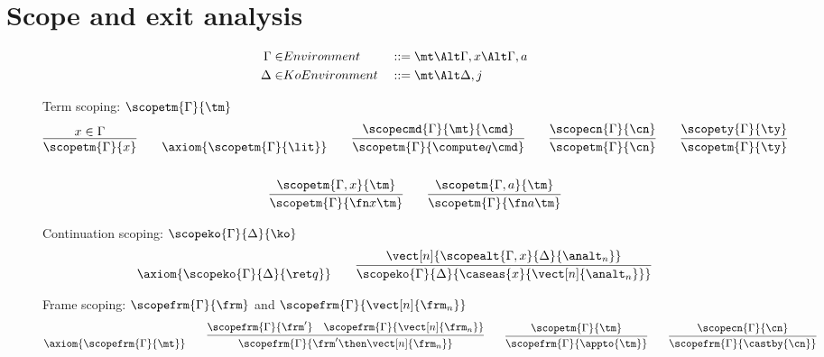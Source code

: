 \documentclass{article}
\begin{document}
\section{Scope and exit analysis}
\label{sec:scope-analysis}

\begin{figure}
\centering
\begin{gather*}
\begin{aligned}
  \Gamma \in& Environment
  &
  &::= \mt
  \Alt \Gamma, x
  \Alt \Gamma, a
  \\
  \Delta \in& KoEnvironment
  &
  &::= \mt
  \Alt \Delta, j
\end{aligned}
\end{gather*}

Term scoping: $\scopetm{\Gamma}{\tm}$
\begin{gather*}
  \infer
  {\scopetm{\Gamma}{x}}
  {x \in \Gamma}
  \qquad
  \axiom{\scopetm{\Gamma}{\lit}}
  \qquad
  \infer
  {\scopetm{\Gamma}{\compute q \cmd}}
  {\scopecmd{\Gamma}{\mt}{\cmd}}
  \qquad
  \infer
  {\scopetm{\Gamma}{\cn}}
  {\scopecn{\Gamma}{\cn}}
  \qquad
  \infer
  {\scopetm{\Gamma}{\ty}}
  {\scopety{\Gamma}{\ty}}
  \\\\
  \infer
  {\scopetm{\Gamma}{\fn x \tm}}
  {\scopetm{\Gamma, x}{\tm}}
  \qquad
  \infer
  {\scopetm{\Gamma}{\fn a \tm}}
  {\scopetm{\Gamma, a}{\tm}}
\end{gather*}

Continuation scoping: $\scopeko{\Gamma}{\Delta}{\ko}$
\begin{gather*}
  \axiom
  {\scopeko{\Gamma}{\Delta}{\ret q}}
  \qquad
  \infer
  {\scopeko{\Gamma}{\Delta}{\caseas{x}{\vect[n]{\analt_n}}}}
  {
    \vect[n]{
      \scopealt{\Gamma, x}{\Delta}{\analt_n}
    }
  }
\end{gather*}

Frame scoping: $\scopefrm{\Gamma}{\frm}$ and
$\scopefrm{\Gamma}{\vect[n]{\frm_n}}$
\begin{gather*}
  \axiom{\scopefrm{\Gamma}{\mt}}
  \qquad
  \infer
  {\scopefrm{\Gamma}{\frm' \then \vect[n]{\frm_n}}}
  {
    \scopefrm{\Gamma}{\frm'}
    &
    \scopefrm{\Gamma}{\vect[n]{\frm_n}}
  }
  \qquad
  \infer
  {\scopefrm{\Gamma}{\appto{\tm}}}
  {\scopetm{\Gamma}{\tm}}
  \qquad
  \infer
  {\scopefrm{\Gamma}{\castby{\cn}}}
  {\scopecn{\Gamma}{\cn}}
\end{gather*}


\end{figure}
\end{document}
